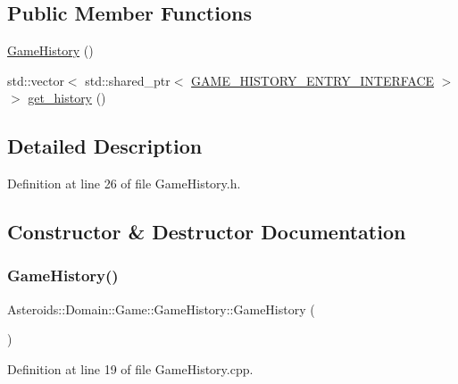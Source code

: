 \subsection*{Public Member Functions}
\begin{DoxyCompactItemize}
\item 
\hyperlink{classAsteroids_1_1Domain_1_1Game_1_1GameHistory_aac502f5e6eb4886d13dab61d23ec3217}{Game\+History} ()
\item 
std\+::vector$<$ std\+::shared\+\_\+ptr$<$ \hyperlink{classAsteroids_1_1Domain_1_1Game_1_1GAME__HISTORY__ENTRY__INTERFACE}{G\+A\+M\+E\+\_\+\+H\+I\+S\+T\+O\+R\+Y\+\_\+\+E\+N\+T\+R\+Y\+\_\+\+I\+N\+T\+E\+R\+F\+A\+CE} $>$ $>$ \hyperlink{classAsteroids_1_1Domain_1_1Game_1_1GameHistory_ad01c0196f3b831e06ae03d86d659ec6f}{get\+\_\+history} ()
\end{DoxyCompactItemize}


\subsection{Detailed Description}


Definition at line 26 of file Game\+History.\+h.



\subsection{Constructor \& Destructor Documentation}
\mbox{\label{classAsteroids_1_1Domain_1_1Game_1_1GameHistory_aac502f5e6eb4886d13dab61d23ec3217}} 
\subsubsection{\texorpdfstring{Game\+History()}{GameHistory()}}
{\footnotesize\ttfamily Asteroids\+::\+Domain\+::\+Game\+::\+Game\+History\+::\+Game\+History (\begin{DoxyParamCaption}{ }\end{DoxyParamCaption})}



Definition at line 19 of file Game\+History.\+cpp.



